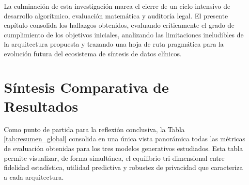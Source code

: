 
La culminación de esta investigación marca el cierre de un ciclo intensivo de desarrollo algorítmico, evaluación matemática y auditoría legal. El presente capítulo consolida los hallazgos obtenidos, evaluando críticamente el grado de cumplimiento de los objetivos iniciales, analizando las limitaciones ineludibles de la arquitectura propuesta y trazando una hoja de ruta pragmática para la evolución futura del ecosistema de síntesis de datos clínicos.

\section{Síntesis Comparativa de Resultados}

Como punto de partida para la reflexión conclusiva, la Tabla \ref{tab:resumen_global} consolida en una única vista panorámica todas las métricas de evaluación obtenidas para los tres modelos generativos estudiados. Esta tabla permite visualizar, de forma simultánea, el equilibrio tri-dimensional entre fidelidad estadística, utilidad predictiva y robustez de privacidad que caracteriza a cada arquitectura.


